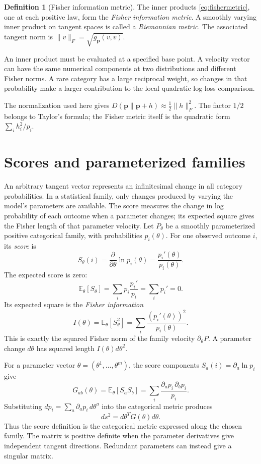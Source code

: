 \documentclass[11pt,oneside,openany]{book}
\theoremstyle{definition}
\newtheorem{definition}[theorem]{Definition}
\theoremstyle{remark}
\newcommand{\E}{\mathbb{E}}
\newcommand{\p}{\mathbf{p}}
\numberwithin{equation}{chapter}
\begin{document}
\begin{definition}[Fisher information metric]
The inner products \eqref{eq:fishermetric}, one at each positive law, form the \emph{Fisher information metric}. A smoothly varying inner product on tangent spaces is called a \emph{Riemannian metric}. The associated tangent norm is $\|v\|_F=\sqrt{g_\p(v,v)}$.
\end{definition}

An inner product must be evaluated at a specified base point. A velocity vector can have the same numerical components at two distributions and different Fisher norms. A rare category has a large reciprocal weight, so changes in that probability make a larger contribution to the local quadratic log-loss comparison.

The normalization used here gives $D(\p\|\p+h)\approx\tfrac12\|h\|_F^2$. The factor $1/2$ belongs to Taylor's formula; the Fisher metric itself is the quadratic form $\sum_i h_i^2/p_i$.

\section{Scores and parameterized families}
An arbitrary tangent vector represents an infinitesimal change in all category probabilities. In a statistical family, only changes produced by varying the model's parameters are available. The score measures the change in log probability of each outcome when a parameter changes; its expected square gives the Fisher length of that parameter velocity.
Let $P_\theta$ be a smoothly parameterized positive categorical family, with probabilities $p_i(\theta)$. For one observed outcome $i$, its \emph{score} is
\[
S_\theta(i)=\frac{\partial}{\partial\theta}\ln p_i(\theta)
=\frac{p_i'(\theta)}{p_i(\theta)}.
\]
The expected score is zero:
\[
\E_\theta[S_\theta]=\sum_i p_i\frac{p_i'}{p_i}=\sum_i p_i'=0.
\]
Its expected square is the \emph{Fisher information}
\begin{equation}\label{eq:scoreinfo}
I(\theta)=\E_\theta[S_\theta^2]=\sum_i\frac{(p_i'(\theta))^2}{p_i(\theta)}.
\end{equation}
This is exactly the squared Fisher norm of the family velocity $\partial_\theta P$. A parameter change $d\theta$ has squared length $I(\theta)d\theta^2$.

For a parameter vector $\theta=(\theta^1,\ldots,\theta^m)$, the score components $S_a(i)=\partial_a\ln p_i$ give
\begin{equation}\label{eq:informationmatrix}
G_{ab}(\theta)=\E_\theta[S_aS_b]
=\sum_i\frac{\partial_ap_i\,\partial_bp_i}{p_i}.
\end{equation}
Substituting $dp_i=\sum_a\partial_ap_i\,d\theta^a$ into the categorical metric produces
\[
ds^2=d\theta^TG(\theta)d\theta.
\]
Thus the score definition is the categorical metric expressed along the chosen family. The matrix is positive definite when the parameter derivatives give independent tangent directions. Redundant parameters can instead give a singular matrix.
\end{document}

